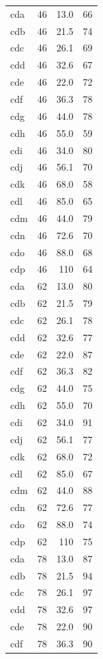 \documentclass{article}
\begin{document}
\begin{center}
\begin{longtable}{L{0.2} R{0.18} R{0.2} R{0.2}}
						cda & 46 & 13.0 & 66 \\
						cdb & 46 & 21.5 & 74 \\
						cdc & 46 & 26.1 & 69 \\
						cdd & 46 & 32.6 & 67 \\
						cde & 46 & 22.0 & 72 \\
						cdf & 46 & 36.3 & 78 \\
						cdg & 46 & 44.0 & 78 \\
						cdh & 46 & 55.0 & 59 \\
						cdi & 46 & 34.0 & 80\\
						cdj & 46 & 56.1 & 70 \\
						cdk & 46 & 68.0 & 58 \\
						cdl & 46 & 85.0 & 65 \\
						cdm & 46 & 44.0 & 79 \\
						cdn & 46 & 72.6 & 70 \\
						cdo & 46 & 88.0 & 68 \\
						cdp & 46 & 110 & 64 \\
						cda & 62 & 13.0 & 80 \\
						cdb & 62 & 21.5 & 79 \\
						cdc & 62 & 26.1 & 78 \\
						cdd & 62 & 32.6 & 77 \\
						cde & 62 & 22.0 & 87 \\
						cdf & 62 & 36.3 & 82 \\
						cdg & 62 & 44.0 & 75 \\
						cdh & 62 & 55.0 & 70 \\
						cdi & 62 & 34.0 & 91 \\
						cdj & 62 & 56.1 & 77 \\
						cdk & 62 & 68.0 & 72 \\
						cdl & 62 & 85.0 & 67 \\
						cdm & 62 & 44.0 & 88 \\
						cdn & 62 & 72.6 & 77 \\
						cdo & 62 & 88.0 & 74 \\
						cdp & 62 & 110 & 75 \\
						cda & 78 & 13.0 & 87 \\
						cdb & 78 & 21.5 & 94 \\
						cdc & 78 & 26.1 & 97 \\
						cdd & 78 & 32.6 & 97 \\
						cde & 78 & 22.0 & 90 \\
						cdf & 78 & 36.3 & 90 \\

\end{longtable}
\end{center}
\end{document}
